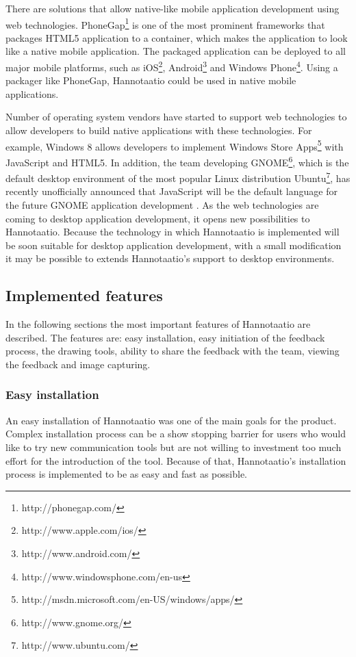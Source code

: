 \documentclass[english,12pt,a4paper,pdftex]{article}
\begin{document}
There are solutions that allow native-like mobile application development using web technologies. PhoneGap\footnote{http://phonegap.com/} is one of the most prominent frameworks that packages HTML5 application to a container, which makes the application to look like a native mobile application. The packaged application can be deployed to all major mobile platforms, such as iOS\footnote{http://www.apple.com/ios/}, Android\footnote{http://www.android.com/} and Windows Phone\footnote{http://www.windowsphone.com/en-us}. Using a packager like PhoneGap, Hannotaatio could be used in native mobile applications.

Number of operating system vendors have started to support web technologies to allow developers to build native applications with these technologies. For example, Windows 8 allows developers to implement Windows Store Apps\footnote{http://msdn.microsoft.com/en-US/windows/apps/} with JavaScript and HTML5. In addition, the team developing GNOME\footnote{http://www.gnome.org/}, which is the default desktop environment of the most popular Linux distribution Ubuntu\footnote{http://www.ubuntu.com/}, has recently unofficially announced that JavaScript will be the default language for the future GNOME application development \citep{treitter2013}. As the web technologies are coming to desktop application development, it opens new possibilities to Hannotaatio. Because the technology in which Hannotaatio is implemented will be soon suitable for desktop application development, with a small modification it may be possible to extends Hannotaatio's support to desktop environments.

\subsection{Implemented features}

In the following sections the most important features of Hannotaatio are described. The features are: easy installation, easy initiation of the feedback process, the drawing tools, ability to share the feedback with the team, viewing the feedback and image capturing.

\subsubsection{Easy installation}

An easy installation of Hannotaatio was one of the main goals for the product. Complex installation process can be a show stopping barrier for users who would like to try new communication tools but are not willing to investment too much effort for the introduction of the tool. Because of that, Hannotaatio's installation process is implemented to be as easy and fast as possible.
\end{document}
